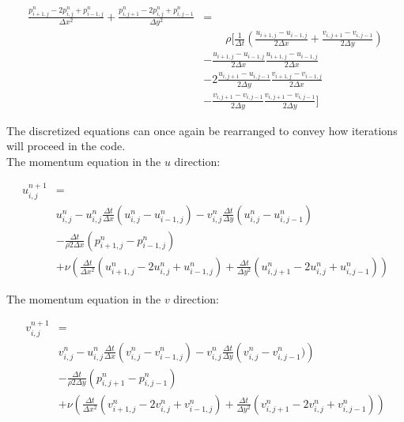 \documentclass{article}
\begin{document}
    \begin{equation}
        \begin{aligned}
            \frac{p_{i+1,j}^{n}-2p_{i,j}^{n}+p_{i-1,j}^{n}}{\Delta x^2}+\frac{p_{i,j+1}^{n}-2p_{i,j}^{n}+p_{i,j-1}^{n}}{\Delta y^2} & = \\
            & \qquad \rho \biggr[ \frac{1}{\Delta t}\left(\frac{u_{i+1,j}-u_{i-1,j}}{2\Delta x}+\frac{v_{i,j+1}-v_{i,j-1}}{2\Delta y}\right) \\
            & -\frac{u_{i+1,j}-u_{i-1,j}}{2\Delta x}\frac{u_{i+1,j}-u_{i-1,j}}{2\Delta x} \\ 
            & - 2\frac{u_{i,j+1}-u_{i,j-1}}{2\Delta y}\frac{v_{i+1,j}-v_{i-1,j}}{2\Delta x} \\
            & - \frac{v_{i,j+1}-v_{i,j-1}}{2\Delta y}\frac{v_{i,j+1}-v_{i,j-1}}{2\Delta y} \biggr]
        \end{aligned}
    \end{equation}
    
    \noindent The discretized equations can once again be rearranged to convey how iterations will proceed in the code.\\
    
    \noindent  The momentum equation in the $u$ direction:

    \begin{equation}
    \begin{aligned}
    u_{i,j}^{n+1} & = \\
    & u_{i,j}^{n} - u_{i,j}^{n} \frac{\Delta t}{\Delta x} \left(u_{i,j}^{n}-u_{i-1,j}^{n}\right) - v_{i,j}^{n} \frac{\Delta t}{\Delta y} \left(u_{i,j}^{n}-u_{i,j-1}^{n}\right) \\
    & - \frac{\Delta t}{\rho 2\Delta x} \left(p_{i+1,j}^{n}-p_{i-1,j}^{n}\right) \\
    & + \nu \left(\frac{\Delta t}{\Delta x^2} \left(u_{i+1,j}^{n}-2u_{i,j}^{n}+u_{i-1,j}^{n}\right) + \frac{\Delta t}{\Delta y^2} \left(u_{i,j+1}^{n}-2u_{i,j}^{n}+u_{i,j-1}^{n}\right)\right)
    \end{aligned}
    \end{equation}
    

    \noindent The momentum equation in the $v$ direction:

    \begin{equation}
    \begin{aligned}
    v_{i,j}^{n+1} &= \\
    & v_{i,j}^{n} - u_{i,j}^{n} \frac{\Delta t}{\Delta x} \left(v_{i,j}^{n}-v_{i-1,j}^{n}\right) - v_{i,j}^{n} \frac{\Delta t}{\Delta y} \left(v_{i,j}^{n}-v_{i,j-1}^{n})\right) \\
    & - \frac{\Delta t}{\rho 2\Delta y} \left(p_{i,j+1}^{n}-p_{i,j-1}^{n}\right) \\
    & + \nu \left(\frac{\Delta t}{\Delta x^2} \left(v_{i+1,j}^{n}-2v_{i,j}^{n}+v_{i-1,j}^{n}\right) + \frac{\Delta t}{\Delta y^2} \left(v_{i,j+1}^{n}-2v_{i,j}^{n}+v_{i,j-1}^{n}\right)\right)
    \end{aligned}
    \end{equation}
    
\end{document}
